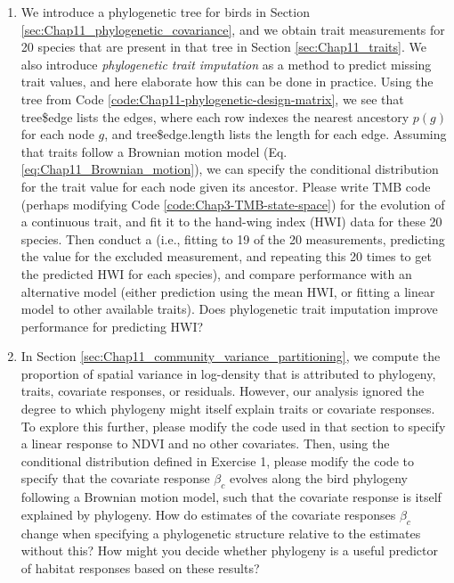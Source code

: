\begin{enumerate}
    \item We introduce a phylogenetic tree for birds in Section \ref{sec:Chap11_phylogenetic_covariance}, and we obtain trait measurements for 20 species that are present in that tree in Section \ref{sec:Chap11_traits}.  We also introduce \textit{phylogenetic trait imputation} as a method to predict missing trait values, and here elaborate how this can be done in practice.  Using the tree from Code \ref{code:Chap11-phylogenetic-design-matrix}, we see that \colorbox{backcolour}{tree\$edge} lists the edges, where each row indexes the nearest ancestory \(p(g)\) for each node \(g\), and \colorbox{backcolour}{tree\$edge.length} lists the length for each edge.  Assuming that traits follow a Brownian motion model (Eq. \ref{eq:Chap11_Brownian_motion}), we can specify the conditional distribution for the trait value for each node given its ancestor.  Please write TMB code (perhaps modifying Code \ref{code:Chap3-TMB-state-space}) for the evolution of a continuous trait, and fit it to the hand-wing index (HWI) data for these 20 species.  Then conduct a  (i.e., fitting to 19 of the 20 measurements, predicting the value for the excluded measurement, and repeating this 20 times to get the predicted HWI for each species), and compare performance with an alternative model (either prediction using the mean HWI, or fitting a linear model to other available traits).  Does phylogenetic trait imputation improve performance for predicting HWI?

    \item In Section \ref{sec:Chap11_community_variance_partitioning}, we compute the proportion of spatial variance in log-density that is attributed to phylogeny, traits, covariate responses, or residuals.  However, our analysis ignored the degree to which phylogeny might itself explain traits or covariate responses.  To explore this further, please modify the code used in that section to specify a linear response to NDVI and no other covariates.  Then, using the conditional distribution defined in Exercise 1, please modify the code to specify that the covariate response \(\beta_c\) evolves along the bird phylogeny following a Brownian motion model, such that the covariate response is itself explained by phylogeny.  How do estimates of the covariate responses \(\beta_c\) change when specifying a phylogenetic structure relative to the estimates without this?  How might you decide whether phylogeny is a useful predictor of habitat responses based on these results?
\end{enumerate}
